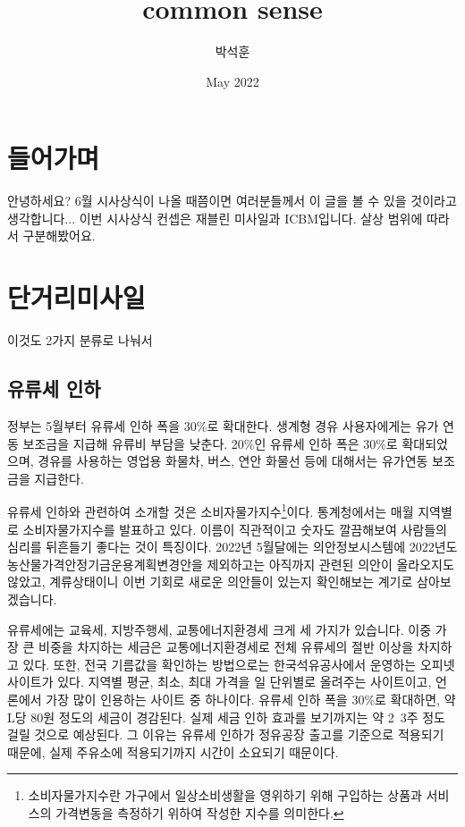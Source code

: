 \documentclass[preprint]{revtex4-2}
\begin{document}
\title{common sense}
\author{박석훈}
\date{May 2022}


\section{들어가며}
안녕하세요? 6월 시사상식이 나올 때쯤이면 여러분들께서 이 글을 볼 수 있을 것이라고 생각합니다... 이번 시사상식 컨셉은 재블린 미사일과 ICBM입니다. 살상 범위에 따라서 구분해봤어요. 

\section{단거리미사일}

이것도 2가지 분류로 나눠서

\subsection{유류세 인하}

정부는 5월부터 유류세 인하 폭을 30\%로 확대한다. 생계형 경유 사용자에게는 유가 연동 보조금을 지급해 유류비 부담을 낮춘다. 20\%인 유류세 인하 폭은 30\%로 확대되었으며, 경유를 사용하는 영업용 화물차, 버스, 연안 화물선 등에 대해서는 유가연동 보조금을 지급한다.

유류세 인하와 관련하여 소개할 것은 소비자물가지수\footnote{소비자물가지수란 가구에서 일상소비생활을 영위하기 위해 구입하는 상품과 서비스의 가격변동을 측정하기 위하여 작성한 지수를 의미한다.}이다. 통계청에서는 매월 지역별로 소비자물가지수를 발표하고 있다. 이름이 직관적이고 숫자도 깔끔해보여 사람들의 심리를 뒤흔들기 좋다는 것이 특징이다. 2022년 5월달에는 의안정보시스템에 2022년도 농산물가격안정기금운용계획변경안을 제외하고는 아직까지 관련된 의안이 올라오지도 않았고, 계류상태이니 이번 기회로 새로운 의안들이 있는지 확인해보는 계기로 삼아보겠습니다.

유류세에는 교육세, 지방주행세, 교통에너지환경세 크게 세 가지가 있습니다. 이중 가장 큰 비중을 차지하는 세금은 교통에너지환경세로 전체 유류세의 절반 이상을 차지하고 있다. 또한, 전국 기름값을 확인하는 방법으로는 한국석유공사에서 운영하는 오피넷 사이트가 있다. 지역별 평균, 최소, 최대 가격을 일 단위별로 올려주는 사이트이고, 언론에서 가장 많이 인용하는 사이트 중 하나이다. 유류세 인하 폭을 30\%로 확대하면, 약 L당 80원 정도의 세금이 경감된다. 실제 세금 인하 효과를 보기까지는 약 2~3주 정도 걸릴 것으로 예상된다. 그 이유는 유류세 인하가 정유공장 출고를 기준으로 적용되기 때문에, 실제 주유소에 적용되기까지 시간이 소요되기 때문이다. \\
\end{document}
